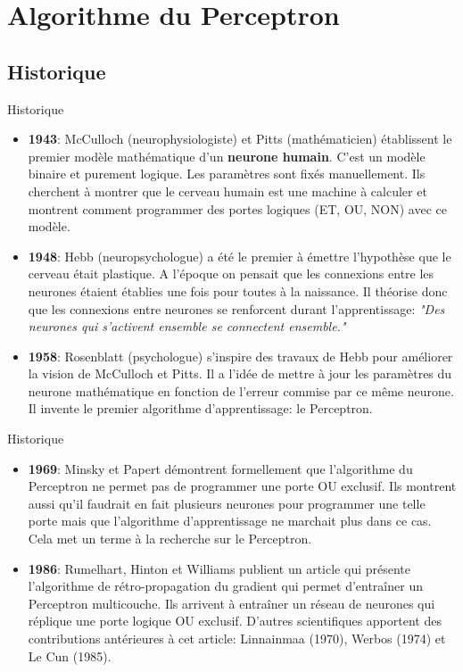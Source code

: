 \section[Algorithme du Perceptron]{Algorithme du Perceptron}

\subsection[Historique]{Historique}

\begin{frame}{Historique}
	\begin{itemize}
		\item \textbf{1943}: McCulloch (neurophysiologiste) et Pitts (mathématicien) établissent le premier modèle mathématique d'un \textbf{neurone humain}. C'est un modèle binaire et purement logique. Les paramètres sont fixés manuellement. Ils cherchent à montrer que le cerveau humain est une machine à calculer et montrent comment programmer des portes logiques (ET, OU, NON) avec ce modèle.
		\pause
		\item \textbf{1948}: Hebb (neuropsychologue) a été le premier à émettre l'hypothèse que le cerveau était plastique. A l'époque on pensait que les connexions entre les neurones étaient établies une fois pour toutes à la naissance. Il théorise donc que les connexions entre neurones se renforcent durant l'apprentissage: \textit{"Des neurones qui s'activent ensemble se connectent ensemble."}
		\item \textbf{1958}: Rosenblatt (psychologue) s'inspire des travaux de Hebb pour améliorer la vision de McCulloch et Pitts. Il a l'idée de mettre à jour les paramètres du neurone mathématique en fonction de l'erreur commise par ce même neurone. Il invente le premier algorithme d'apprentissage: le Perceptron.
	\end{itemize}
\end{frame}

\begin{frame}{Historique}
	\begin{itemize}
		\item \textbf{1969}: Minsky et Papert démontrent formellement que l'algorithme du Perceptron ne permet pas de programmer une porte OU exclusif. Ils montrent aussi qu'il faudrait en fait plusieurs neurones pour programmer une telle porte mais que l'algorithme d'apprentissage ne marchait plus dans ce cas. Cela met un terme à la recherche sur le Perceptron.
		\pause 
		\item \textbf{1986}: Rumelhart, Hinton et Williams publient un article qui présente l'algorithme de rétro-propagation du gradient qui permet d'entraîner un Perceptron multicouche. Ils arrivent à entraîner un réseau de neurones qui réplique une porte logique OU exclusif. D'autres scientifiques apportent des contributions antérieures à cet article: Linnainmaa (1970), Werbos (1974) et Le Cun (1985).
	\end{itemize}
\end{frame}

